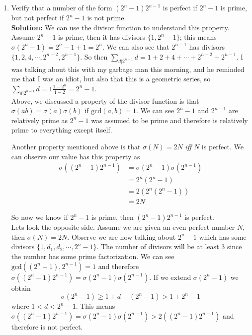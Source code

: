 \documentclass[10pt]{article}
\newcommand{\solution}{\color{blue}\textbf{Solution:} \color{black}}
\begin{document}
	
	\begin{enumerate}
		\item Verify that a number of the form $(2^n -1)2^{n-1}$ is perfect if $2^n -1$ is prime, but not perfect if $2^n-1$ is not prime.\\
		
		    \solution We can use the divisor function to understand this property. Assume $2^n - 1$ is prime, then it has divisors $\{1, 2^n-1\}$; this means $\sigma(2^n - 1) = 2^n - 1 + 1 = 2^n$. We can also see that $2^{n-1}$ has divisors $\{1 , 2 , 4 , \cdots , 2^{n-2} , 2^{n-1}\}$. So then $\sum_{d | 2^{n-1}} d = 1 + 2 + 4 + \cdots + 2^{n-2} + 2^{n-1}$. I was talking about this with my garbage man this morning, and he reminded me that I was an idiot, but also that this is a geometric series, so $\sum_{d | 2^{n-1}} d = 1 \frac{1 - 2^{n}}{1 - 2} = 2^n - 1$.\\

            Above, we discussed a property of the divisor function is that $\sigma(ab) = \sigma(a)\sigma(b)$ if $\text{gcd}(a,b) = 1$. We can see $2^n -1$ and $2^{n-1}$ are relatively prime as $2^n - 1$ was assumed to be prime and therefore is relatively prime to everything except itself. 

            Another property mentioned above is that $\sigma(N) = 2N$ \textit{iff} $N$ is perfect. We can observe our value has this property as 
            \begin{align*}
                \sigma((2^n - 1)2^{n-1}) &= \sigma(2^n - 1)\sigma(2^{n-1})\\
                                         &= 2^n (2^n - 1)\\
                                         &= 2 (2^n (2^n - 1))\\
                                         &= 2N
            \end{align*}

            So now we know if $2^n - 1$ is prime, then $(2^n - 1)2^{n-1}$ is perfect.\\

            Lets look the opposite side. Assume we are given an even perfect number $N$, then $\sigma(N) = 2N$. Observe we are now talking about $2^n - 1$ which has some divisors $\{1, d_1, d_2, \cdots, 2^n - 1\}$. The number of divisors will be at least 3 since the number has some prime factorization. We can see $\text{gcd}((2^n - 1), 2^{n-1}) = 1$ and therefore $\sigma((2^n - 1)2^{n-1}) = \sigma(2^n - 1) \sigma(2^{n-1})$. If we extend $\sigma(2^n - 1)$ we obtain
            \[\sigma(2^n - 1) \geq 1 + d + (2^n - 1) > 1 + 2^n - 1\]
            where $1 < d < 2^n - 1$. This means $\sigma((2^n - 1)2^{n-1}) = \sigma(2^n - 1) \sigma(2^{n-1}) > 2((2^n - 1)2^{n-1})$ and therefore is not perfect.


\end{enumerate}
\end{document}
